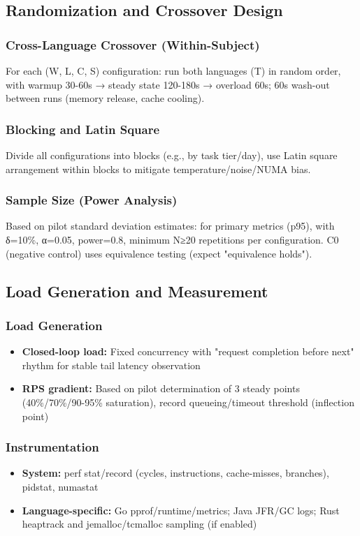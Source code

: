 \subsection{Randomization and Crossover Design}

\subsubsection{Cross-Language Crossover (Within-Subject)}
For each (W, L, C, S) configuration: run both languages (T) in random order, with warmup 30-60s → steady state 120-180s → overload 60s; 60s wash-out between runs (memory release, cache cooling).

\subsubsection{Blocking and Latin Square}
Divide all configurations into blocks (e.g., by task tier/day), use Latin square arrangement within blocks to mitigate temperature/noise/NUMA bias.

\subsubsection{Sample Size (Power Analysis)}
Based on pilot standard deviation estimates: for primary metrics (p95), with δ=10\%, α=0.05, power=0.8, minimum N≥20 repetitions per configuration. C0 (negative control) uses equivalence testing (expect "equivalence holds").

\subsection{Load Generation and Measurement}

\subsubsection{Load Generation}
\begin{itemize}
    \item \textbf{Closed-loop load:} Fixed concurrency with "request completion before next" rhythm for stable tail latency observation
    \item \textbf{RPS gradient:} Based on pilot determination of 3 steady points (40\%/70\%/90-95\% saturation), record queueing/timeout threshold (inflection point)
\end{itemize}

\subsubsection{Instrumentation}
\begin{itemize}
    \item \textbf{System:} perf stat/record (cycles, instructions, cache-misses, branches), pidstat, numastat
    \item \textbf{Language-specific:} Go pprof/runtime/metrics; Java JFR/GC logs; Rust heaptrack and jemalloc/tcmalloc sampling (if enabled)
\end{itemize}

